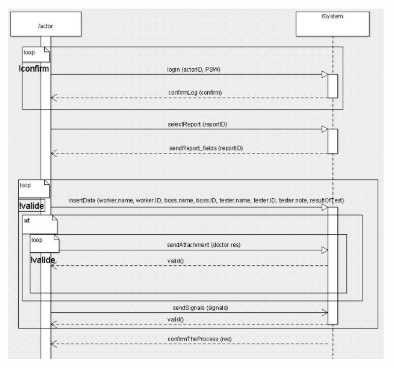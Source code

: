 \begin{figure}[!h]
\centering
\includegraphics[width=100mm, keepaspectratio]{figures/ssd2.jpg}
\end{figure}
